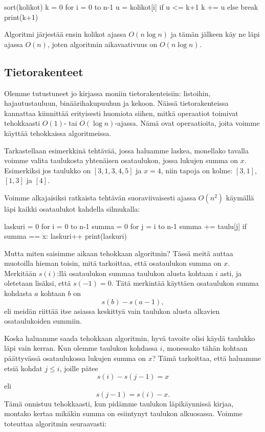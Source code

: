 \begin{code}
sort(kolikot)
k = 0
for i = 0 to n-1
    u = kolikot[i]
    if u <= k+1
        k += u
    else
        break
print(k+1)
\end{code}

Algoritmi järjestää ensin kolikot ajassa $O(n \log n)$
ja tämän jälkeen käy ne läpi ajassa $O(n)$,
joten algoritmin aikavaativuus on $O(n \log n)$.

\subsection{Tietorakenteet}

Olemme tutustuneet jo kirjassa moniin tietorakenteisiin:
listoihin, hajautustauluun, binäärihakupuuhun ja kekoon.
Näissä tietorakenteissa kannattaa kiinnittää erityisesti huomiota siihen,
mitkä operaatiot toimivat tehokkaasti $O(1)$- tai $O(\log n)$-ajassa.
Nämä ovat operaatioita, joita voimme käyttää tehokkaissa algoritmeissa.

Tarkastellaan esimerkkinä tehtävää, jossa haluamme laskea,
monellako tavalla voimme valita taulukosta yhtenäisen osataulukon,
jossa lukujen summa on $x$.
Esimerkiksi jos taulukko on $[3,1,3,4,5]$ ja $x=4$,
niin tapoja on kolme: $[3,1]$, $[1,3]$ ja $[4]$.

Voimme alkajaisiksi ratkaista tehtävän suoraviivaisesti ajassa $O(n^2)$
käy\-mällä läpi kaikki osataulukot kahdella silmukalla:

\begin{code}
laskuri = 0
for i = 0 to n-1
    summa = 0
    for j = i to n-1
        summa += taulu[j]
        if summa == x:
            laskuri++
print(laskuri)
\end{code}

Mutta miten saisimme aikaan tehokkaan algoritmin?
Tässä meitä auttaa muotoilla hieman toisin, mitä tarkoittaa,
että osataulukon summa on $x$.
Merkitään $s(i)$:llä osataulukon summaa taulukon alusta
kohtaan $i$ asti, ja oletetaan lisäksi, että $s(-1)=0$.
Tätä merkintää käyttäen osataulukon summa
kohdasta $a$ kohtaan $b$ on
\[s(b)-s(a-1),\]
eli meidän riittää itse asiassa keskittyä vain taulukon alusta
alkavien osataulukoiden summiin.

Koska haluamme saada tehokkaan algoritmin,
hyvä tavoite olisi käydä taulukko läpi vain kerran.
Kun olemme taulukon kohdassa $i$,
monessako tähän kohtaan päättyvässä osataulukossa
lukujen summa on $x$?
Tämä tarkoittaa, että haluamme etsiä kohdat $j \le i$,
joille pätee
\[s(i)-s(j-1)=x\]
eli
\[s(j-1)=s(i)-x.\]
Tämä onnistuu tehokkaasti, kun pidämme taulukon läpikäynnissä
kirjaa, montako kertaa mikäkin summa on esiintynyt taulukon alkuosassa.
Voimme toteuttaa algoritmin seuraavasti:

